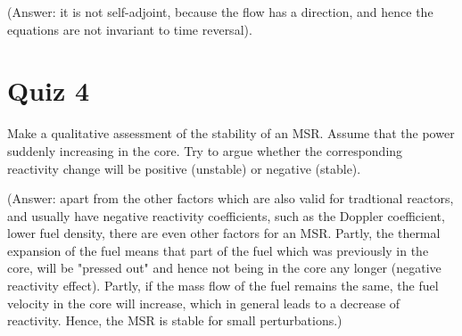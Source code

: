 \documentclass[openright, 12pt, a4paper, twoside, onecolumn]{book}
\newcommand*{\smallspace}{\vspace{0.5cm}}
\begin{document}
(Answer: it is not self-adjoint, because the flow has a direction, and hence the equations are not invariant to time reversal). 

\section*{Quiz 4}

Make a qualitative assessment of the stability of an MSR. Assume that the power suddenly increasing in the core. Try to argue whether the corresponding reactivity change will be positive (unstable) or negative (stable).
\smallspace

(Answer: apart from the other factors which are also valid for tradtional reactors, and usually have negative reactivity coefficients, such as the Doppler coefficient, lower fuel density, there are even other factors for an MSR. Partly, the thermal expansion of the fuel means that part of the fuel which was previously in the core, will be "pressed out" and hence not being in the core any longer (negative reactivity effect). Partly, if the mass flow of the fuel remains the same, the fuel velocity in the core will increase, which in general leads to a decrease of reactivity. Hence, the MSR is stable for small perturbations.)
\end{document}
